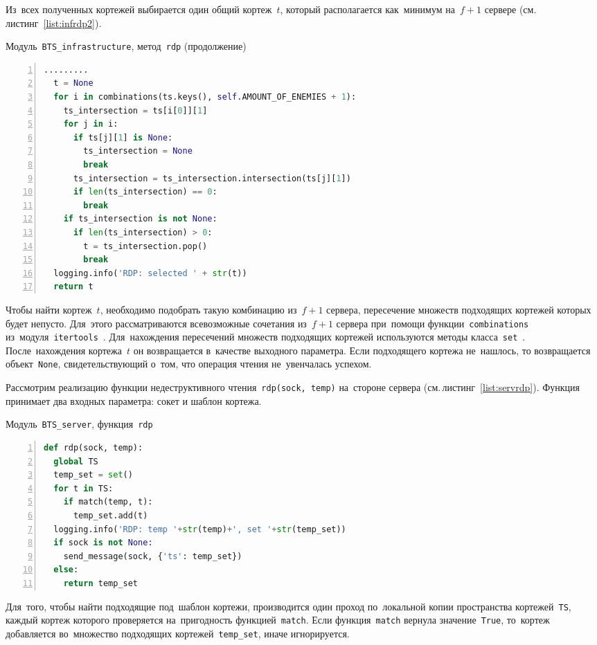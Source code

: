 Из~всех полученных кортежей выбирается один общий кортеж~$t$, который располагается как~минимум на~$f + 1$ сервере (см.\,листинг~\ref{list:infrdp2}).
\begin{ListingEnv}\caption{Модуль~\texttt{BTS\_infrastructure}, метод~\texttt{rdp} (продолжение)}\label{list:infrdp2}
	\begin{lstlisting}[language=Python, numbers=left]
  .........
  t = None
  for i in combinations(ts.keys(), self.AMOUNT_OF_ENEMIES + 1):
    ts_intersection = ts[i[0]][1]
    for j in i:
      if ts[j][1] is None:
        ts_intersection = None
        break
      ts_intersection = ts_intersection.intersection(ts[j][1])
      if len(ts_intersection) == 0:
        break
    if ts_intersection is not None:
      if len(ts_intersection) > 0:
        t = ts_intersection.pop()
        break
  logging.info('RDP: selected ' + str(t))
  return t
	\end{lstlisting}
\end{ListingEnv}
Чтобы найти кортеж~$t$, необходимо подобрать такую комбинацию из~$f + 1$ сервера, пересечение множеств подходящих кортежей которых будет непусто. Для~этого рассматриваются всевозможные сочетания из~$f + 1$ сервера при~помощи функции~\texttt{combinations} из~модуля~\texttt{itertools}~\autocite{itertools}. Для~нахождения пересечений множеств подходящих кортежей используются методы класса~\texttt{set}~\autocite{set}. После~нахождения кортежа~$t$ он возвращается в~качестве выходного параметра. Если подходящего кортежа не~нашлось, то возвращается объект~\texttt{None}, свидетельствующий о~том, что операция чтения не~увенчалась успехом.

Рассмотрим реализацию функции недеструктивного чтения~\texttt{rdp(sock, temp)} на~стороне сервера (см.\,листинг~\ref{list:servrdp}). Функция принимает два входных параметра: сокет и шаблон кортежа.
\begin{ListingEnv}\caption{Модуль~\texttt{BTS\_server}, функция~\texttt{rdp}}\label{list:servrdp}
	\begin{lstlisting}[language=Python, numbers=left]
def rdp(sock, temp):
  global TS
  temp_set = set()
  for t in TS:
    if match(temp, t):
      temp_set.add(t) 
  logging.info('RDP: temp '+str(temp)+', set '+str(temp_set))
  if sock is not None:
    send_message(sock, {'ts': temp_set})
  else:
    return temp_set
	\end{lstlisting}
\end{ListingEnv}
Для~того, чтобы найти подходящие под~шаблон кортежи, производится один проход по~локальной копии пространства кортежей~\texttt{TS}, каждый кортеж которого проверяется на~пригодность функцией~\texttt{match}. Если функция~\texttt{match} вернула значение~\texttt{True}, то~кортеж добавляется во~множество подходящих кортежей~\texttt{temp_set}, иначе игнорируется.

